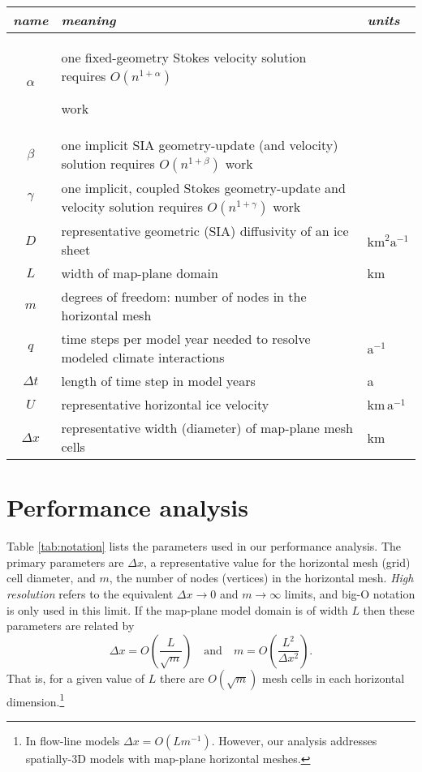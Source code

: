 \documentclass[twocolumn,letterpaper]{igs}
\begin{document}
\begin{table*}[ht]
{\normalsize
\begin{tabular}{cll}
\emph{name} & \emph{meaning} & \emph{units} \\ \hline
$\alpha$    & one fixed-geometry Stokes velocity solution requires $O(n^{1+\alpha})${\large \strut} work\\
$\beta$     & one implicit SIA geometry-update (and velocity) solution requires $O(n^{1+\beta})$ work \\
$\gamma$    & one implicit, coupled Stokes geometry-update and velocity solution requires $O(n^{1+\gamma})$ work \\
$D$         & representative geometric (SIA) diffusivity of an ice sheet & $\text{km}^2 \text{a}^{-1}$ \\
$L$         & width of map-plane domain & km \\
$m$         & degrees of freedom: number of nodes in the horizontal mesh \\
$q$         & time steps per model year needed to resolve modeled climate interactions & $\text{a}^{-1}$ \\
$\Delta t$  & length of time step in model years & a \\
$U$         & representative horizontal ice velocity & $\text{km}\,\text{a}^{-1}$ \\
$\Delta x$  & representative width (diameter) of map-plane mesh cells & km
\end{tabular}
}
\caption{Parameters for performance analysis; $\alpha,\beta,\gamma,n$ are pure numbers.}
\label{tab:notation}
\end{table*}


\section{Performance analysis}

Table \ref{tab:notation} lists the parameters used in our performance analysis.  The primary parameters are $\Delta x$, a representative value for the horizontal mesh (grid) cell diameter, and $m$, the number of nodes (vertices) in the horizontal mesh.  \emph{High resolution} refers to the equivalent $\Delta x\to 0$ and $m\to\infty$ limits, and big-O notation is only used in this limit.  If the map-plane model domain is of width $L$ then these parameters are related by
\begin{equation}
\Delta x = O\left(\frac{L}{\sqrt{m}}\right) \quad \text{and} \quad m = O\left(\frac{L^2}{\Delta x^2}\right).  \label{eq:paramrelation}
\end{equation}
That is, for a given value of $L$ there are $O(\sqrt{m})$ mesh cells in each horizontal dimension.\footnote{In flow-line models $\Delta x = O(L m^{-1})$.  However, our analysis addresses spatially-3D models with map-plane horizontal meshes.}
\end{document}
